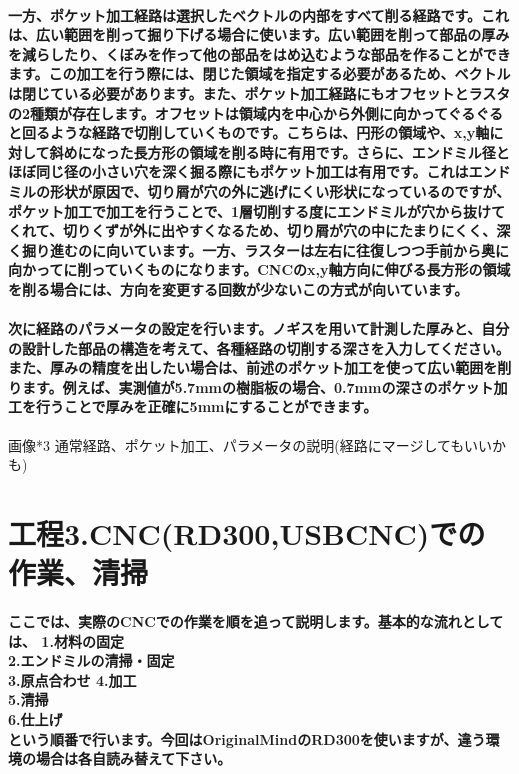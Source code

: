 \documentclass[b5paper, 9pt, twocolumn, titlepage,openany]{jsbook}%
\begin{document}
\paragraph{一方、ポケット加工経路は選択したベクトルの内部をすべて削る経路です。これは、広い範囲を削って掘り下げる場合に使います。広い範囲を削って部品の厚みを減らしたり、くぼみを作って他の部品をはめ込むような部品を作ることができます。この加工を行う際には、閉じた領域を指定する必要があるため、ベクトルは閉じている必要があります。また、ポケット加工経路にもオフセットとラスタの2種類が存在します。オフセットは領域内を中心から外側に向かってぐるぐると回るような経路で切削していくものです。こちらは、円形の領域や、x,y軸に対して斜めになった長方形の領域を削る時に有用です。さらに、エンドミル径とほぼ同じ径の小さい穴を深く掘る際にもポケット加工は有用です。これはエンドミルの形状が原因で、切り屑が穴の外に逃げにくい形状になっているのですが、ポケット加工で加工を行うことで、1層切削する度にエンドミルが穴から抜けてくれて、切りくずが外に出やすくなるため、切り屑が穴の中にたまりにくく、深く掘り進むのに向いています。一方、ラスターは左右に往復しつつ手前から奥に向かってに削っていくものになります。CNCのx,y軸方向に伸びる長方形の領域を削る場合には、方向を変更する回数が少ないこの方式が向いています。}
\paragraph{次に経路のパラメータの設定を行います。ノギスを用いて計測した厚みと、自分の設計した部品の構造を考えて、各種経路の切削する深さを入力してください。また、厚みの精度を出したい場合は、前述のポケット加工を使って広い範囲を削ります。例えば、実測値が5.7mmの樹脂板の場合、0.7mmの深さのポケット加工を行うことで厚みを正確に5mmにすることができます。}

画像*3 通常経路、ポケット加工、パラメータの説明(経路にマージしてもいいかも)

\section{工程3.CNC(RD300,USBCNC)での作業、清掃}
\paragraph{ここでは、実際のCNCでの作業を順を追って説明します。基本的な流れとしては、
1.材料の固定\\
2.エンドミルの清掃・固定\\
3.原点合わせ
4.加工\\
5.清掃\\
6.仕上げ\\
という順番で行います。今回はOriginalMindのRD300を使いますが、違う環境の場合は各自読み替えて下さい。}
\end{document}
